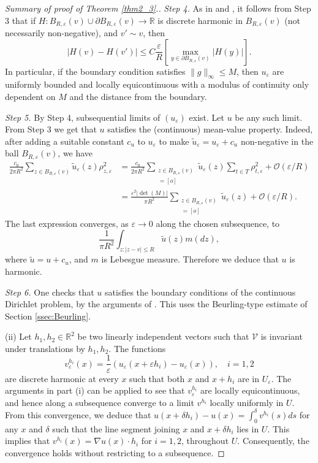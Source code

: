 \documentclass[11pt]{article}
\theoremstyle{remark}
\def\eps{\varepsilon}
\def\cV{\mathcal{V}}
\newcommand{\eqnsplst}[1]{\begin{equation*}\begin{split}%
   #1\end{split}\end{equation*}}
\begin{document}
\begin{proof}[Summary of proof of Theorem \ref{thm2_3}.]
\emph{Step 4.} As in \cite[Proposition 2.7]{CS11} and \cite[Corollary 2.9]{CS11}, it follows from 
Step 3 that if $H : B_{R,\eps}(v) \cup \partial B_{R,\eps}(v) \to \mathbb{R}$ is discrete harmonic 
in $B_{R,\eps}(v)$ (not necessarily non-negative), and $v' \sim v$, then
\[ | H(v) - H(v') |
     \le C \frac{\eps}{R} \left[ \max_{y \in \partial B_{R,\eps}(v)} |H(y)| \right]. \]
In particular, if the boundary condition satisfies $\| g \|_\infty \le M$, then $u_\eps$
are uniformly bounded and locally equicontinuous with a modulus of continuity only dependent
on $M$ and the distance from the boundary.

\emph{Step 5.} 
By Step 4, subsequential limits of $(u_\eps)$ exist. Let $u$ be any such limit. 
From Step 3 we get that $u$ satisfies the (continuous) mean-value property. 
Indeed, after adding a suitable constant $c_u$ to $u_\eps$
to make $\tilde{u}_\eps = u_\eps + c_u$ non-negative in the ball $B_{R,\eps}(v)$, we have
\eqnsplst{
  \frac{c_0}{2 \pi R^2} \sum_{z \in B_{R,\eps}(v)} \tilde{u}_\eps(z) \rho^2_{z,\eps}
  &= \frac{c_0}{2 \pi R^2} \sum_{\substack{z \in B_{R,\eps}(v) \\ [z] = [o]}} \tilde{u}_\eps(z)
     \sum_{t \in T} \rho^2_{t,\eps} + \mathcal{O}( \eps/R ) \\
  &= \frac{\eps^2 |\det(M)|}{\pi R^2} \sum_{\substack{z \in B_{R,\eps}(v) \\ [z] = [o]}} \tilde{u}_\eps(z)
     + \mathcal{O}( \eps/R ). }
The last expression converges, as $\eps \to 0$ along the chosen subsequence, to 
\[ \frac{1}{\pi R^2} \int_{z : |z - v| \le R} \tilde{u}(z) m(dz), \]
where $\tilde{u} = u + c_u$, and $m$ is Lebesgue measure. Therefore we deduce 
that $u$ is harmonic.

\emph{Step 6.} 
One checks that $u$ satisfies the boundary conditions of the continuous Dirichlet problem, 
by the arguments of \cite[Proposition 3.3]{CS11}. This uses the Beurling-type estimate
of Section \ref{ssec:Beurling}. 

\medbreak

(ii) Let $h_1, h_2 \in \mathbb{R}^2$ be two linearly independent vectors such that $\cV$ is invariant under 
translations by $h_1, h_2$. The functions
\[ v^{h_i}_\eps(x)
   = \frac{1}{\eps} (u_\eps(x + \eps h_i) - u_\eps(x)), \quad i = 1, 2 \]
are discrete harmonic at every $x$ such that both $x$ and $x+h_i$ are in $U_\eps$. The arguments 
in part (i) can be applied to see that $v^{h_i}_\eps$ are locally equicontinuous, and hence along 
a subsequence converge to a limit $v^{h_i}$ locally uniformly in $U$. From this convergence, we 
deduce that 
$u(x+\delta h_i) - u(x) = \int_0^\delta v^{h_i}(s) ds$ for any $x$ and $\delta$ such that the line segment
joining $x$ and $x + \delta h_i$ lies in $U$. This implies that 
$v^{h_i}(x) = \nabla u(x) \cdot h_i$ for $i = 1,2$, throughout $U$. Consequently, the convergence holds
without restricting to a subsequence.


\end{proof}
\end{document}
